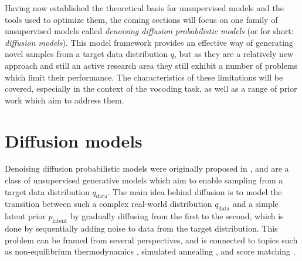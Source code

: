 \documentclass{report}
\begin{document}
Having now established the theoretical basis for unsupervised models and the tools used to optimize them, the coming sections will focus on one family of unsupervised models called \textit{denoising diffusion probabilistic models} (or for short: \textit{diffusion models}). This model framework provides an effective way of generating novel samples from a target data distribution $q$, but as they are a relatively new approach and still an active research area they still exhibit a number of problems which limit their performance. The characteristics of these limitations will be covered, especially in the context of the vocoding task, as well as a range of prior work which aim to address them.

\section{Diffusion models} \label{sec:diff}
Denoising diffusion probabilistic models were originally proposed in  \cite{Sohl-Dickstein_Weiss_Maheswaranathan_Ganguli_2015}, and are a class of unsupervised generative models which aim to enable sampling from a target data distribution $q_{\text{data}}$. The main idea behind diffusion is to model the transition between such a complex real-world distribution $q_{\text{data}}$ and a simple latent prior $p_{\text{latent}}$ by gradually diffusing from the first to the second, which is done by sequentially adding noise to data from the target distribution. This problem can be framed from several perspectives, and is connected to topics such as non-equilibrium thermodynamics \cite{Sohl-Dickstein_Weiss_Maheswaranathan_Ganguli_2015}, simulated annealing \cite{neal2001annealed}, and score matching \cite{song2019generative}.
\end{document}
